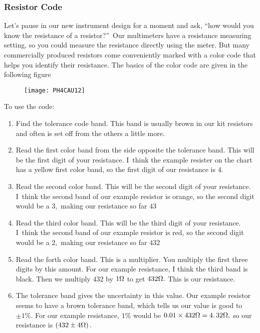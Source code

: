 \subsubsection{Resistor Code}

Let's pause in our new instrument design for a moment and ask,
\textquotedblleft how would you know the resistance of a
resistor?\textquotedblright\ Our multimeters have a resistance measuring
setting, so you could measure the resistance directly using the meter. But
many commercially produced resistors come conveniently marked with a color
code that helps you identify their resistance. The basics of the color code
are given in the following figure\bigskip \begin{figure}[h!]
\texttt{[image: PH4CAU12]}
\end{figure}

To use the code:

\begin{enumerate}
\item Find the tolerance code band. This band is usually brown in our kit
resistors and often is set off from the others a little more.

\item Read the first color band from the side opposite the tolerance band.
This will be the first digit of your resistance. I\ think the example
resister on the chart has a yellow first color band, so the first digit of
our resistance is $4.$

\item Read the second color band. This will be the second digit of your
resistance. I\ think the second band of our example resistor is orange, so
the second digit would be a $3,$ making our resistance so far $43$

\item Read the third color band. This will be the third digit of your
resistance. I\ think the second band of our example resistor is red, so the
second digit would be a $2,$ making our resistance so far $432$

\item Read the forth color band. This is a multiplier. You multiply the
first three digits by this amount. For our example resistance, I think the
third band is black. Then we multiply $432$ by $1\unit{%
\Omega%
}$ to get $432\unit{%
\Omega%
}.$ This is our resistance.

\item The tolerance band gives the uncertainty in this value. Our example
resistor seems to have a brown tolerance band, which tells us our value is
good to $\pm 1\%.$ For our example resistance, $1\%$ would be $0.01\times 432%
\unit{%
\Omega%
}=\allowbreak 4.\,\allowbreak 32\unit{%
\Omega%
},$ so our resistance is $\left( 432\pm 4\unit{%
\Omega%
}\right) .$
\end{enumerate}

